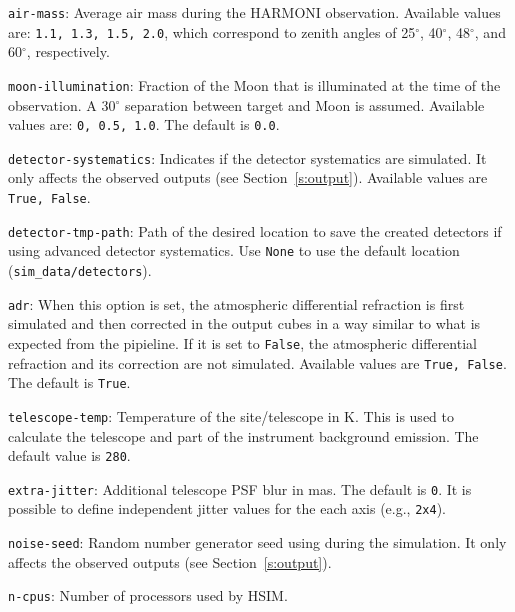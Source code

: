 \documentclass[12pt]{report}
\begin{document}
\begin{description}
\item \texttt{air-mass}: Average air mass during the HARMONI observation. Available values are: \texttt{1.1, 1.3, 1.5, 2.0}, which correspond to zenith angles of 25$^{\circ}$, 40$^{\circ}$, 48$^{\circ}$, and 60$^{\circ}$, respectively.

\item \texttt{moon-illumination}: Fraction of the Moon that is illuminated at the time of the observation. A 30$^{\circ}$ separation between target and Moon is assumed. Available values are: \texttt{0, 0.5, 1.0}. The default is \texttt{0.0}.

\item \texttt{detector-systematics}: Indicates if the detector systematics are simulated. It only affects the observed outputs (see Section~\ref{s:output}). Available values are \texttt{True, False}.

\item \texttt{detector-tmp-path}: Path of the desired location to save the created detectors if using advanced detector systematics. Use \texttt{None} to use the default location (\texttt{sim\_data/detectors}).

\item \texttt{adr}: When this option is set, the atmospheric differential refraction is first simulated and then corrected in the output cubes in a way similar to what is expected from the pipieline. If it is set to \texttt{False}, the atmospheric differential refraction and its correction are not simulated. Available values are \texttt{True, False}. The default is \texttt{True}.

\item \texttt{telescope-temp}: Temperature of the site\slash telescope in K. This is used to calculate the telescope and part of the instrument background emission. The default value is \texttt{280}.

\item \texttt{extra-jitter}: Additional telescope PSF blur in mas. The default is \texttt{0}. It is possible to define independent jitter values for the each axis (e.g., \texttt{2x4}).

\item \texttt{noise-seed}: Random number generator seed using during the simulation. It only affects the observed outputs (see Section~\ref{s:output}).

\item \texttt{n-cpus}: Number of processors used by HSIM.

\end{description}
\end{document}
